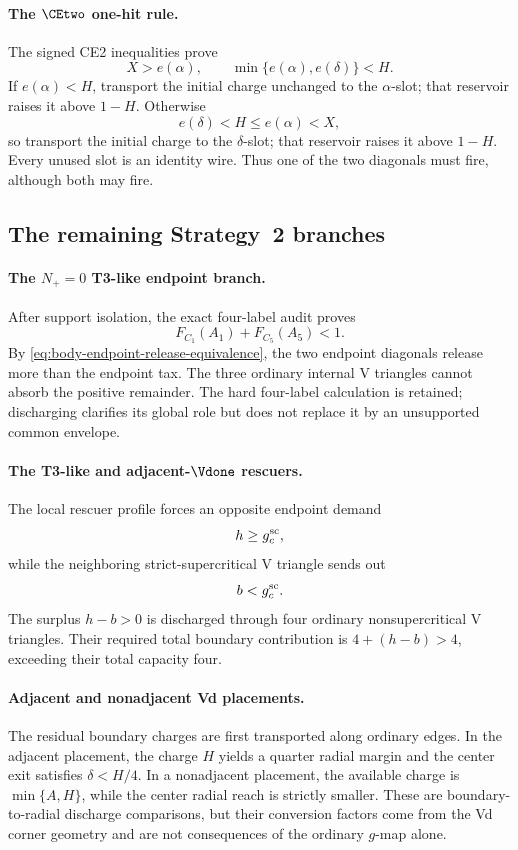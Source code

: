 \paragraph{The \(\CEtwo\) one-hit rule.}
The signed CE2 inequalities prove
\[
 X>e(\alpha),
 \qquad
 \min\{e(\alpha),e(\delta)\}<H.
\]
If \(e(\alpha)<H\), transport the initial charge unchanged to the
\(\alpha\)-slot; that reservoir raises it above \(1-H\).  Otherwise
\[
 e(\delta)<H\le e(\alpha)<X,
\]
so transport the initial charge to the \(\delta\)-slot; that reservoir raises
it above \(1-H\).  Every unused slot is an identity wire.  Thus one of the two
diagonals must fire, although both may fire.

\subsection{The remaining Strategy~2 branches}

\paragraph{The \(N_+=0\) T3-like endpoint branch.}
After support isolation, the exact four-label audit proves
\[
 F_{C_1}(A_1)+F_{C_5}(A_5)<1.
\]
By \eqref{eq:body-endpoint-release-equivalence}, the two endpoint diagonals
release more than the endpoint tax.  The three ordinary internal V triangles
cannot absorb the positive remainder.  The hard four-label calculation is
retained; discharging clarifies its global role but does not replace it by an
unsupported common envelope.

\paragraph{The T3-like and adjacent-\(\Vdone\) rescuers.}
The local rescuer profile forces an opposite endpoint demand
\[
 h\ge g_c^{\rm sc},
\]
while the neighboring strict-supercritical V triangle sends out
\[
 b<g_c^{\rm sc}.
\]
The surplus \(h-b>0\) is discharged through four ordinary
nonsupercritical V triangles.  Their required total boundary contribution is
\(4+(h-b)>4\), exceeding their total capacity four.

\paragraph{Adjacent and nonadjacent Vd placements.}
The residual boundary charges are first transported along ordinary edges.  In
the adjacent placement, the charge \(H\) yields a quarter radial margin and
the center exit satisfies \(\delta<H/4\).  In a nonadjacent placement, the
available charge is \(\min\{A,H\}\), while the center radial reach is strictly
smaller.  These are boundary-to-radial discharge comparisons, but their
conversion factors come from the Vd corner geometry and are not consequences
of the ordinary \(g\)-map alone.

